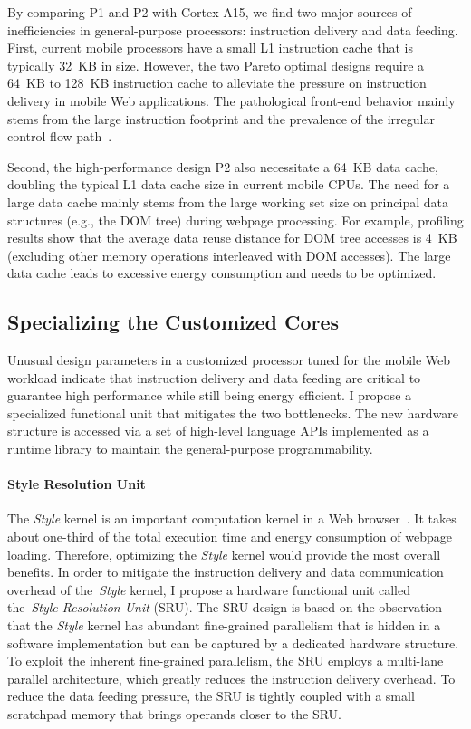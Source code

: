 By comparing P1 and P2 with Cortex-A15, we find two major sources of inefficiencies in general-purpose processors: instruction delivery and data feeding. First, current mobile processors have a small L1 instruction cache that is typically 32~KB in size. However, the two Pareto optimal designs require a 64~KB to 128~KB instruction cache to alleviate the pressure on instruction delivery in mobile Web applications. The pathological front-end behavior mainly stems from the large instruction footprint and the prevalence of the irregular control flow path~\cite{bbench}.

Second, the high-performance design P2 also necessitate a 64~KB data cache, doubling the typical L1 data cache size in current mobile CPUs. The need for a large data cache mainly stems from the large working set size on principal data structures (e.g., the DOM tree) during webpage processing. For example, profiling results show that the average data reuse distance for DOM tree accesses is 4~KB (excluding other memory operations interleaved with DOM accesses). The large data cache leads to excessive energy consumption and needs to be optimized.

\subsection{Specializing the Customized Cores}
\label{sec:arch:specialization}

Unusual design parameters in a customized processor tuned for the mobile Web workload indicate that instruction delivery and data feeding are critical to guarantee high performance while still being energy efficient. I propose a specialized functional unit that mitigates the two bottlenecks. The new hardware structure is accessed via a set of high-level language APIs implemented as a runtime library to maintain the general-purpose programmability.

\paragraph{Style Resolution Unit} The \textit{Style} kernel is an important computation kernel in a Web browser~\cite{webcore}. It takes about one-third of the total execution time and energy consumption of webpage loading. Therefore, optimizing the \textit{Style} kernel would provide the most overall benefits. In order to mitigate the instruction delivery and data communication overhead of the~\textit{Style} kernel, I propose a hardware functional unit called the~\textit{Style Resolution Unit} (SRU). The SRU design is based on the observation that the \textit{Style} kernel has abundant fine-grained parallelism that is hidden in a software implementation but can be captured by a dedicated hardware structure. To exploit the inherent fine-grained parallelism, the SRU employs a multi-lane parallel architecture, which greatly reduces the instruction delivery overhead. To reduce the data feeding pressure, the SRU is tightly coupled with a small scratchpad memory that brings operands closer to the SRU.

